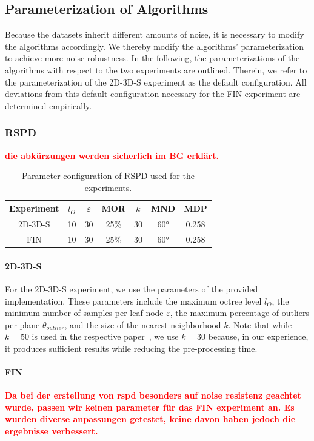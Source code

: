 \documentclass[main.tex]{subfiles}
\begin{document}
\subsection{Parameterization of Algorithms}
Because the datasets inherit different amounts of noise, it is necessary to modify the algorithms accordingly.
We thereby modify the algorithms' parameterization to achieve more noise robustness.
In the following, the parameterizations of the algorithms with respect to the two experiments are outlined.
Therein, we refer to the parameterization of the 2D-3D-S experiment as the default configuration.
All deviations from this default configuration necessary for the FIN experiment are determined empirically.


\subsubsection{RSPD}
\textbf{\textcolor{red}{die abkürzungen werden sicherlich im BG erklärt.}}
\begin{table}[H]
    \centering
    \begin{tabular}{c|cccccc}
        Experiment & $l_O$ & $\varepsilon$ & MOR  & $k$ & MND & MDP   \\ \hline
        2D-3D-S    & 10    & 30            & 25\% & 30  & 60° & 0.258 \\
        FIN        & 10    & 30            & 25\% & 30  & 60° & 0.258
    \end{tabular}%
    \caption{Parameter configuration of RSPD used for the experiments.}
    \label{tab:rspd-param}
\end{table}

\paragraph{2D-3D-S}
For the 2D-3D-S experiment, we use the parameters of the provided implementation. These parameters include the maximum octree level $l_O$,
the minimum number of samples per leaf node $\varepsilon$, the maximum percentage of outliers per plane $\theta_{outlier}$, and
the size of the nearest neighborhood $k$. Note that while $k=50$ is used in the respective paper~\cite[Section~3.3]{Araújo_Oliveira_2020},
we use $k=30$ because, in our experience, it produces sufficient results while reducing the pre-processing time.

\paragraph{FIN}
\textbf{\textcolor{red}{Da bei der erstellung von rspd besonders auf noise resistenz geachtet wurde, passen wir keinen parameter für
        das FIN experiment an.
        Es wurden diverse anpassungen getestet, keine davon haben jedoch die ergebnisse verbessert.}}
\end{document}
